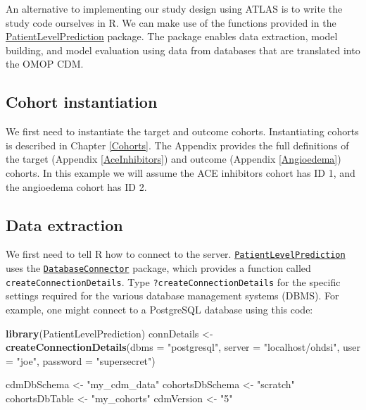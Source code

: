 \documentclass[11pt]{book}
\newenvironment{Shaded}{\begin{snugshade}}{\end{snugshade}}
\newcommand{\DataTypeTok}[1]{\textcolor[rgb]{0.13,0.29,0.53}{#1}}
\newcommand{\KeywordTok}[1]{\textcolor[rgb]{0.13,0.29,0.53}{\textbf{#1}}}
\newcommand{\NormalTok}[1]{#1}
\newcommand{\StringTok}[1]{\textcolor[rgb]{0.31,0.60,0.02}{#1}}
\theoremstyle{definition}
\theoremstyle{definition}
\theoremstyle{definition}
\theoremstyle{remark}
\begin{document}
An alternative to implementing our study design using ATLAS is to write the study code ourselves in R. We can make use of the functions provided in the \href{https://ohdsi.github.io/PatientLevelPrediction/}{PatientLevelPrediction} package. The package enables data extraction, model building, and model evaluation using data from databases that are translated into the OMOP CDM.

\hypertarget{cohort-instantiation-2}{%
\subsection{Cohort instantiation}\label{cohort-instantiation-2}}

We first need to instantiate the target and outcome cohorts. Instantiating cohorts is described in Chapter \ref{Cohorts}. The Appendix provides the full definitions of the target (Appendix \ref{AceInhibitors}) and outcome (Appendix \ref{Angioedema}) cohorts. In this example we will assume the ACE inhibitors cohort has ID 1, and the angioedema cohort has ID 2.

\hypertarget{data-extraction-3}{%
\subsection{Data extraction}\label{data-extraction-3}}

We first need to tell R how to connect to the server. \href{https://ohdsi.github.io/PatientLevelPrediction/}{\texttt{PatientLevelPrediction}} uses the \href{https://ohdsi.github.io/DatabaseConnector/}{\texttt{DatabaseConnector}} package, which provides a function called \texttt{createConnectionDetails}. Type \texttt{?createConnectionDetails} for the specific settings required for the various database management systems (DBMS). For example, one might connect to a PostgreSQL database using this code:

\begin{Shaded}
\begin{Highlighting}[]
\KeywordTok{library}\NormalTok{(PatientLevelPrediction)}
\NormalTok{connDetails <-}\StringTok{ }\KeywordTok{createConnectionDetails}\NormalTok{(}\DataTypeTok{dbms =} \StringTok{"postgresql"}\NormalTok{,}
                                       \DataTypeTok{server =} \StringTok{"localhost/ohdsi"}\NormalTok{,}
                                       \DataTypeTok{user =} \StringTok{"joe"}\NormalTok{,}
                                       \DataTypeTok{password =} \StringTok{"supersecret"}\NormalTok{)}

\NormalTok{cdmDbSchema <-}\StringTok{ "my_cdm_data"}
\NormalTok{cohortsDbSchema <-}\StringTok{ "scratch"}
\NormalTok{cohortsDbTable <-}\StringTok{ "my_cohorts"}
\NormalTok{cdmVersion <-}\StringTok{ "5"}
\end{Highlighting}
\end{Shaded}
\end{document}
